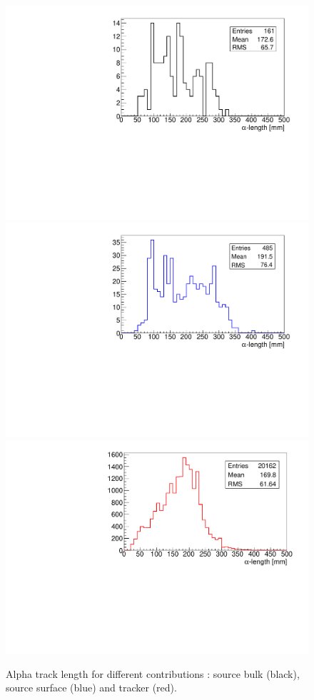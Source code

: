 \documentclass[main.tex]{subfiles}
\begin{document}
\begin{figure}[h!]
\begin{center}
\includegraphics[scale=0.39]{pictures/Chap5/length_alpha_tracker_selection_bulk.pdf}
\includegraphics[scale=0.39]{pictures/Chap5/length_alpha_tracker_selection_surface.pdf}
\includegraphics[scale=0.39]{pictures/Chap5/length_alpha_tracker_selection_tracker.pdf}
\caption{Alpha track length for different contributions : source bulk (black), source surface (blue) and tracker (red).}
\label{alpha_length_tracker_selection}
\end{center}
\end{figure}
\end{document}
